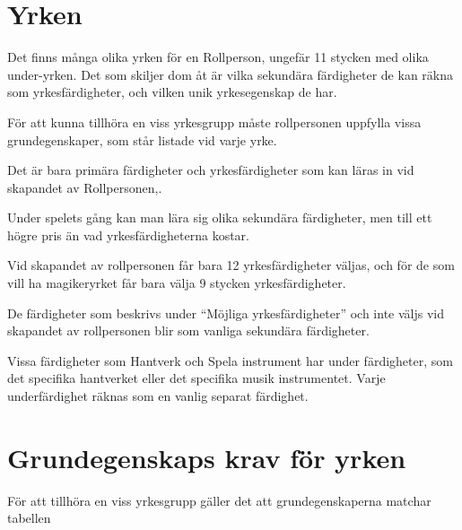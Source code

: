 \documentclass[a4paper, 10pt, titlepage]{article}
\begin{document}
\section{Yrken}

Det finns många olika yrken för en Rollperson, ungefär 11 stycken med olika under-yrken.
Det som skiljer dom åt är vilka sekundära färdigheter de kan räkna som yrkesfärdigheter, och
vilken unik yrkesegenskap de har.

För att kunna tillhöra en viss yrkesgrupp måste rollpersonen uppfylla vissa grundegenskaper, som
står listade vid varje yrke.

Det är bara primära färdigheter och yrkesfärdigheter som kan läras in vid skapandet av Rollpersonen,.

Under spelets gång kan man lära sig olika sekundära färdigheter, men till ett högre pris än vad
yrkesfärdigheterna kostar.

Vid skapandet av rollpersonen får bara 12 yrkesfärdigheter väljas, och för de som vill ha
magikeryrket får bara välja 9 stycken yrkesfärdigheter.

De färdigheter som beskrivs under ``Möjliga yrkesfärdigheter'' och inte väljs vid skapandet av
rollpersonen blir som vanliga sekundära färdigheter.

Vissa färdigheter som Hantverk och Spela instrument har under färdigheter, som det specifika hantverket
eller det specifika musik instrumentet. Varje underfärdighet räknas som en vanlig separat färdighet.

\newpage
\section{Grundegenskaps krav för yrken}
För att tillhöra en viss yrkesgrupp gäller det att grundegenskaperna matchar tabellen
\end{document}
